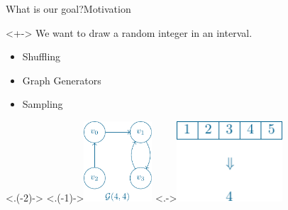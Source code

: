 \begin{frame}{What is our goal?}{Motivation}
    \pause 
    \begin{block}{}<+->
        We want to  draw a  random integer in an interval.
    \end{block}
    
    \begin{itemize}[<+->]
        \item Shuffling
        \item Graph Generators
        \item Sampling
    \end{itemize}

    \smallskip

	\begin{center}
		\onslide<.(-2)->{}
		\hfil
		\onslide<.(-1)->{\includegraphics[height=3cm]{img/standalone/graphs}}
		\hfil
		\onslide<.->{\includegraphics[height=3cm]{img/standalone/sampling}}
	\end{center}
\end{frame}
